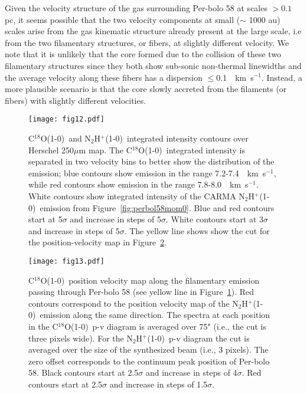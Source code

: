 \documentclass[iop]{emulateapj}
\newcommand{\kms}{\,~km~s$^{-1}$}
\newcommand{\nthp}{\mbox{\rm N$_2$H$^+$(1-0)}}
\newcommand{\ceo}{\mbox{\rm C$^{18}$O(1-0)}}
\begin{document}
Given the velocity structure of the gas surrounding Per-bolo 58 at scales $>0.1$ pc, it seems possible that the two velocity components at small ($\sim$ 1000 au) scales arise from the gas kinematic structure already present at the large scale, i.e from the two filamentary structures, or fibers, at slightly different velocity. We note that it is unlikely that the core formed due to the collision of these two filamentary structures since they both show sub-sonic non-thermal linewidths and the average velocity along these fibers has a dispersion $\leqslant$0.1 \kms \citep{2017HacarFibers}. Instead, a more plausible scenario is that the core slowly accreted from the filaments (or fibers) with slightly different velocities.



\begin{figure}
\center
\texttt{[image: fig12.pdf]}
\caption{\ceo\ and \nthp\ integrated intensity contours over Herschel 250$\mu$m map. The \ceo\ integrated intensity is separated in two velocity bins to better show the distribution of the emission; blue contours show emission in the range 7.2-7.4 \kms, while red contours show emission in the range 7.8-8.0 \kms. White contours show integrated intensity of the CARMA \nthp\ emission from Figure~\ref{fig:perbol58mom0}. Blue and red contours start at 5$\sigma$ and increase in steps of 5$\sigma$. White contours start at 3$\sigma$ and increase in steps of 5$\sigma$. The yellow line shows show the cut for the position-velocity map in Figure~\ref{fig:co_pvmap}.
\label{fig:co_mom0}}
\end{figure}

\begin{figure}
\center
\texttt{[image: fig13.pdf]}
\caption{\ceo\ position velocity map along the filamentary emission passing through Per-bolo 58 (see yellow line in Figure~\ref{fig:co_mom0}). Red contours correspond to the position velocity map of the \nthp\ emission along the same direction. The spectra at each position in the \ceo\ p-v diagram is averaged over 75" (i.e., the cut is three pixels wide). For the \nthp\ p-v diagram the cut is averaged over the size of the synthesized beam (i.e., 3 pixels). The zero offset corresponds to the continuum peak position of Per-bolo 58. Black contours start at 2.5$\sigma$ and increase in steps of 4$\sigma$. Red contours start at 2.5$\sigma$ and increase in steps of 1.5$\sigma$.
\label{fig:co_pvmap}}
\end{figure}
\end{document}
